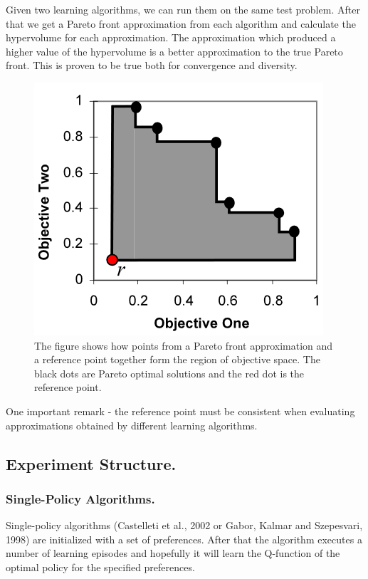 Given two learning algorithms, we can run them on the same test problem. After that we get a Pareto front approximation from each algorithm and calculate the hypervolume for each approximation. The approximation which produced a higher value of the hypervolume is a better approximation to the true Pareto front. This is proven to be true both for convergence and diversity. \\

\begin{figure}[ht]
\centering
\includegraphics[scale=0.9]{hypervolume.png}
\caption{The figure shows how points from a Pareto front approximation and a reference point together form the region of objective space. The black dots are Pareto optimal solutions and the red dot is the reference point.}
\label{fig:hyperVolume}
\end{figure}

One important remark - the reference point must be consistent when evaluating approximations obtained by different learning algorithms. \\

\subsection{Experiment Structure.}

\subsubsection{Single-Policy Algorithms.}
Single-policy algorithms (Castelleti et al., 2002\nocite{castelletti2002reinforcement} or Gabor, Kalmar and Szepesvari, 1998\nocite{gabor1998multi}) are initialized with a set of preferences. After that the algorithm executes a number of learning episodes and hopefully it will learn the Q-function of the optimal policy for the specified preferences.

